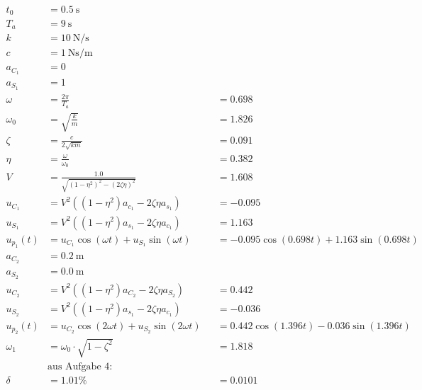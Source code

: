 \begin{solution}
    \begin{solution}  
        \begin{align*}
            t_0 &= \SI{0.5}{\second}\\
            T_a &= \SI{9}{\second} \\
            k &=  \SI{10}{\newton \per \second} \\
            c &= \SI{1}{\newton \second \per \meter} \\
            a_{C_1} &= 0 \\
            a_{S_1} &= 1 \\
            \omega &= \frac{2 \pi}{T_a} &&= 0.698 \\
            \omega_0 &= \sqrt{\frac{k}{m}} &&= 1.826\\
            \zeta &= \frac{c}{2 \sqrt{km}} &&= 0.091\\
            \eta &= \frac{\omega}{\omega_0} &&= 0.382\\
            V &= \frac{1.0}{\sqrt{{(1-\eta^2)}^2 - {(2 \zeta \eta)}^2}} &&= 1.608\\
            u_{C_1}  &= V^2 ((1-\eta^2) a_{c_1} - 2 \zeta \eta a_{s_1}) &&= -0.095 \\ 
            u_{S_1} &= V^2 ((1-\eta^2) a_{s_1} - 2 \zeta \eta a_{c_1}) &&= 1.163 \\  
            u_{p_1}(t) &= u_{C_1} \cos(\omega t) + u_{S_1} \sin(\omega t) &&= -0.095 \cos(0.698 t) + 1.163 \sin(0.698 t)\\
            a_{C_2} &= \SI{0.2}{\meter} \\
            a_{S_2} &= \SI{0.0}{\meter} \\
            u_{C_2} &= V^2 ((1-\eta^2) a_{C_2} - 2 \zeta \eta a_{S_2}) &&= 0.442\\
            u_{S_2} &= V^2 ((1-\eta^2) a_{s_1} - 2 \zeta \eta a_{c_1}) &&= -0.036\\
            u_{p_2}(t) &= u_{C_2} \cos(2\omega t) + u_{S_2} \sin(2\omega t) &&= 0.442 \cos(1.396t) -0.036 \sin(1.396 t) \\
            \omega_1 &= \omega_0 \cdot \sqrt{1 - \zeta^2} &&= 1.818\\
            &\text{aus Aufgabe 4:} \\
            \delta &= 1.01 \% &&= 0.0101\\
        \end{align*}
    \end{solution}
    

\end{solution}
